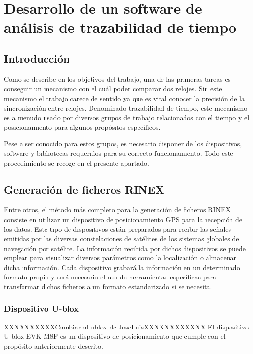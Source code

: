 \chapter{Desarrollo de un software de análisis de trazabilidad de tiempo}

\section{Introducción}

Como se describe en los objetivos del trabajo, una de las primeras tareas es conseguir un mecanismo con el cuál poder comparar dos relojes. Sin este mecanismo el trabajo carece de sentido ya que es vital conocer la precisión de la sincronización entre relojes. Denominado trazabilidad de tiempo, este mecanismo es a menudo usado por diversos grupos de trabajo relacionados con el tiempo y el posicionamiento para algunos propósitos específicos.\newline

Pese a ser conocido para estos grupos, es necesario disponer de los dispositivos, software y bibliotecas requeridos para su correcto funcionamiento. Todo este procedimiento se recoge en el presente apartado.

\section{Generación de ficheros RINEX}
Entre otros, el método más completo para la generación de ficheros RINEX consiste en utilizar un dispositivo de posicionamiento GPS para la recepción de los datos. Este tipo de dispositivos están preparados para recibir las señales emitidas por las diversas constelaciones de satélites de los sistemas globales de navegación por satélite. La información recibida por dichos dispositivos se puede emplear para visualizar diversos parámetros como la localización o almacenar dicha información. Cada dispositivo grabará la información en un determinado formato propio y será necesario el uso de herramientas específicas para transformar dichos ficheros a un formato estandarizado si se necesita.

\subsection{Dispositivo U-blox}
XXXXXXXXXXCambiar al ublox de JoseLuisXXXXXXXXXXXX
El dispositivo U-blox EVK-M8F es un dispositivo de posicionamiento que cumple con el propósito anteriormente descrito. \newline

